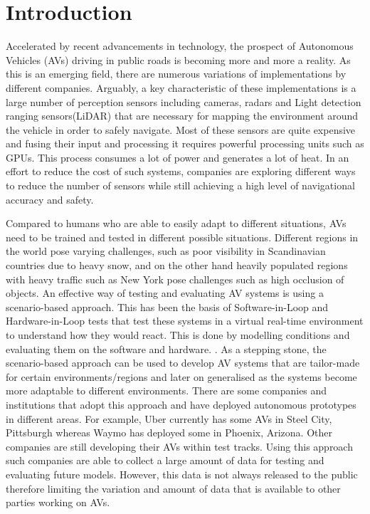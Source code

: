 %
%
\let\textcircled=\pgftextcircled
\chapter{Introduction}
\label{chap:intro}

Accelerated by recent advancements in technology, the prospect of Autonomous Vehicles (AVs) driving in public roads is becoming more and more a reality. As this is an emerging field, there are numerous variations of implementations by different companies. Arguably, a key characteristic of these implementations is a large number of perception sensors including cameras, radars and Light detection ranging sensors(LiDAR) that are necessary for mapping the environment around the vehicle in order to safely navigate. Most of these sensors are quite expensive and fusing their input and processing it requires powerful processing units such as GPUs. This process consumes a lot of power and generates a lot of heat. In an effort to reduce the cost of such systems, companies are exploring different ways to reduce the number of sensors while still achieving a high level of navigational accuracy and safety. 

Compared to humans who are able to easily adapt to different situations, AVs need to be trained and tested in different possible situations. Different regions in the world pose varying challenges, such as poor visibility in Scandinavian countries due to heavy snow, and on the other hand heavily populated regions with heavy traffic such as New York pose challenges such as high occlusion of objects. An effective way of testing and evaluating AV systems is using a scenario-based approach. This has been the basis of Software-in-Loop and Hardware-in-Loop tests that test these systems in a virtual real-time environment to understand how they would react. This is done by modelling conditions and evaluating them on the software and hardware. \cite{}. As a stepping stone, the scenario-based approach can be used to develop AV systems that are tailor-made for certain environments/regions and later on generalised as the systems become more adaptable to different environments. There are some companies and institutions that adopt this approach and have deployed autonomous prototypes in different areas. For example, Uber currently has some AVs in Steel City, Pittsburgh whereas Waymo has deployed some in Phoenix, Arizona\cite{}. Other companies are still developing their AVs within test tracks\cite{}. Using this approach such companies are able to collect a large amount of data for testing and evaluating future models. However, this data is not always released to the public therefore limiting the variation and amount of data that is available to other parties working on AVs. 

